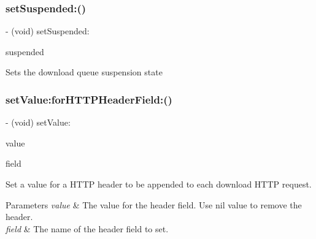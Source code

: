 \subsubsection{\texorpdfstring{set\+Suspended\+:()}{setSuspended:()}\hspace{0.1cm}{\footnotesize\ttfamily [3/3]}}
{\footnotesize\ttfamily -\/ (void) set\+Suspended\+: \begin{DoxyParamCaption}\item[{(B\+O\+OL)}]{suspended }\end{DoxyParamCaption}}

Sets the download queue suspension state \mbox{\label{interface_s_d_web_image_downloader_a119389f3da3de86ef65fd86f76169acb}} 
\subsubsection{\texorpdfstring{set\+Value\+:for\+H\+T\+T\+P\+Header\+Field\+:()}{setValue:forHTTPHeaderField:()}\hspace{0.1cm}{\footnotesize\ttfamily [1/3]}}
{\footnotesize\ttfamily -\/ (void) set\+Value\+: \begin{DoxyParamCaption}\item[{(N\+S\+String $\ast$)}]{value }\item[{forHTTPHeaderField:(N\+S\+String $\ast$)}]{field }\end{DoxyParamCaption}}

Set a value for a H\+T\+TP header to be appended to each download H\+T\+TP request.


\begin{DoxyParams}{Parameters}
{\em value} & The value for the header field. Use {\ttfamily nil} value to remove the header. \\
\hline
{\em field} & The name of the header field to set. \\
\hline
\end{DoxyParams}
\mbox{\label{interface_s_d_web_image_downloader_a119389f3da3de86ef65fd86f76169acb}} 
